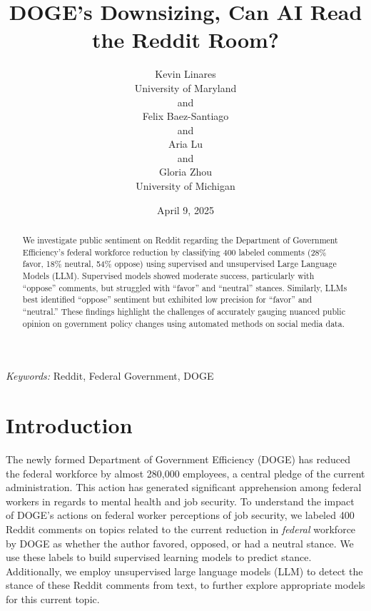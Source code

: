 \documentclass[
  12pt]{article}
\begin{document}
\def\spacingset#1{\renewcommand{\baselinestretch}%
{#1}\small\normalsize} \spacingset{1}



\date{April 9, 2025}
\title{\bf DOGE's Downsizing, Can AI Read the Reddit Room?}
\author{
Kevin Linares\\
University of Maryland\\
and\\Felix Baez-Santiago\\
and\\Aria Lu\\
and\\Gloria Zhou\\
University of Michigan\\
}
\maketitle

\bigskip
\bigskip
\begin{abstract}
We investigate public sentiment on Reddit regarding the Department of
Government Efficiency's federal workforce reduction by classifying 400
labeled comments (28\% favor, 18\% neutral, 54\% oppose) using
supervised and unsupervised Large Language Models (LLM). Supervised
models showed moderate success, particularly with ``oppose'' comments,
but struggled with ``favor'' and ``neutral'' stances. Similarly, LLMs
best identified ``oppose'' sentiment but exhibited low precision for
``favor'' and ``neutral.'' These findings highlight the challenges of
accurately gauging nuanced public opinion on government policy changes
using automated methods on social media data.
\end{abstract}

\noindent%
{\it Keywords:} Reddit, Federal Government, DOGE
\vfill

\newpage
\spacingset{1.9} %


\section{Introduction}\label{sec-intro}

The newly formed Department of Government Efficiency (DOGE) has reduced
the federal workforce by almost 280,000 employees, a central pledge of
the current administration. This action has generated significant
apprehension among federal workers in regards to mental health and job
security. To understand the impact of DOGE's actions on federal worker
perceptions of job security, we labeled 400 Reddit comments on topics
related to the current reduction in \emph{federal} workforce by DOGE as
whether the author favored, opposed, or had a neutral stance. We use
these labels to build supervised learning models to predict stance.
Additionally, we employ unsupervised large language models (LLM) to
detect the stance of these Reddit comments from text, to further explore
appropriate models for this current topic.
\end{document}
